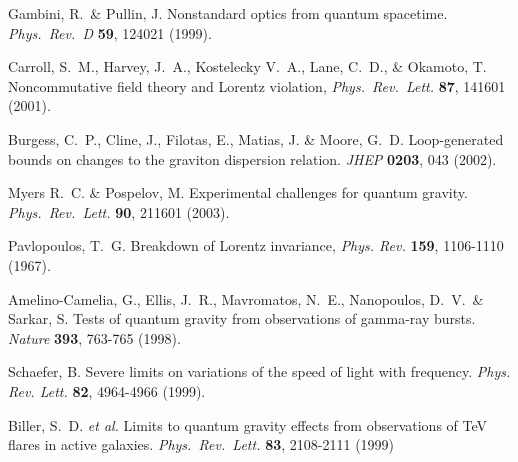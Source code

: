 \documentclass[12pt]{article}
\begin{document}
\begin{thebibliography}{99}

Gambini, R.~\& Pullin, J. Nonstandard optics from quantum
spacetime. {\em Phys.\ Rev.\ D} {\bf 59}, 124021 (1999).

Carroll, S.~M., Harvey, J.~A., Kostelecky V.~A., Lane, C.~D., \&
Okamoto, T. Noncommutative field theory and Lorentz violation,
{\em Phys.\ Rev.\ Lett.} {\bf 87}, 141601 (2001).

Burgess, C.~P., Cline, J., Filotas, E., Matias, J. \& Moore, G.~D.
Loop-generated bounds on changes to the graviton dispersion
relation. {\em JHEP} {\bf 0203}, 043 (2002).

Myers R.~C. \& Pospelov, M. Experimental challenges for
quantum gravity.
{\em Phys.\ Rev.\ Lett.} {\bf 90}, 211601 (2003).

Pavlopoulos, T.~G. Breakdown of Lorentz invariance,
{\em Phys. Rev.} {\bf 159}, 1106-1110 (1967).

Amelino-Camelia, G., Ellis, J.~R., Mavromatos,
N.~E., Nanopoulos, D.~V.~\& Sarkar, S.
Tests of quantum gravity from observations of
gamma-ray bursts. {\em Nature} {\bf 393}, 763-765 (1998).

Schaefer, B. Severe limits on variations of the speed of light
with frequency. {\em Phys. Rev. Lett.} {\bf 82}, 4964-4966 (1999).

Biller, S.~D. {\it et al.} Limits to quantum gravity effects from
observations of TeV flares in  active galaxies. {\em Phys.\ Rev.\
Lett.}  {\bf 83}, 2108-2111 (1999)


\end{thebibliography}
\end{document}
